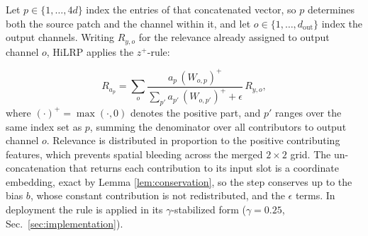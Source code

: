 \documentclass[lettersize,journal]{IEEEtran}
\theoremstyle{definition}
\theoremstyle{plain}
\begin{document}
Let $p\in\{1,\dots,4d\}$ index the entries of that concatenated vector, so $p$ determines both the source patch and the channel within it, and let $o\in\{1,\dots,d_{\mathrm{out}}\}$ index the output channels. Writing $R_{y,o}$ for the relevance already assigned to output channel $o$, HiLRP applies the $z^+$-rule:

\begin{equation}
\label{eq:merge-rule}
R_{a_p} = \sum_{o} \frac{a_p\,(W_{o,p})^+}{\sum_{p'} a_{p'}\,(W_{o,p'})^+ + \epsilon}\, R_{y,o},
\end{equation}
where $(\cdot)^{+}=\max(\cdot,0)$ denotes the positive part, and $p'$ ranges over the same index set as $p$, summing the denominator over all contributors to output channel $o$. Relevance is distributed in proportion to the positive contributing features, 
which prevents spatial bleeding across the merged $2 \times 2$ grid. The un-concatenation that returns each contribution to its input slot is a coordinate embedding, exact by Lemma \ref{lem:conservation}, so the step conserves up to the bias $b$, whose constant contribution is 
not redistributed, and the $\epsilon$ terms. In deployment the rule is applied in its $\gamma$-stabilized form ($\gamma{=}0.25$, Sec.~\ref{sec:implementation}).
\end{document}
